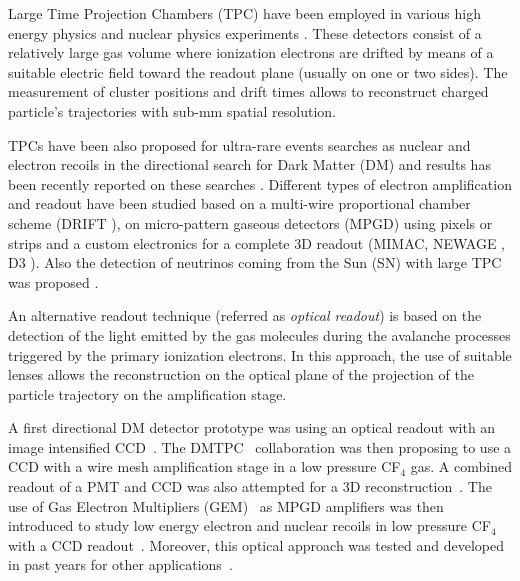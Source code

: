 \documentclass[review]{elsarticle}
\begin{document}
Large Time Projection Chambers (TPC)  have been  employed  in various high energy physics and nuclear physics experiments \cite{bib:tpc1,bib:tpc2,bib:tpc3,bib:tpc4}. These detectors consist of a relatively large gas volume where ionization electrons are drifted by means of a suitable electric field toward the readout plane (usually on one or two sides). The measurement of cluster positions and drift times allows to reconstruct charged particle's trajectories with sub-mm spatial resolution. %

 TPCs have been also proposed for ultra-rare events searches as nuclear and electron recoils in  the directional search for   Dark Matter (DM) and  results has been recently reported on these searches  \cite{Battat:2016xxe,  BATTAT20151,Ikeda:2020mvr}. Different types of electron amplification and readout have been studied\cite{Battat:2016pap} based on a  multi-wire proportional chamber scheme (DRIFT \cite{BATTAT20151,ALNER2005173}), on micro-pattern gaseous detectors (MPGD) using pixels or strips and a custom electronics for a complete 3D readout (MIMAC\cite{Riffard:2016mgw,Sauzet:2020dut}, NEWAGE \cite{Hashimoto:2017hlz}, D3 \cite{bib:vahsen}). Also the detection of neutrinos  coming from the Sun (SN) with large TPC  was proposed \cite{Seguinot:1992zu, ARPESELLA1996333}.
  
An alternative readout technique (referred as {\it optical readout}) is based on the detection of the light emitted by the gas molecules during the avalanche processes triggered by the primary ionization electrons\cite{bib:Fraga,bib:Margato1,bib:Margato2}. In this approach, the use of suitable lenses allows the reconstruction on the optical plane of the projection of the particle trajectory on the amplification stage.

A first directional DM detector prototype was using an optical readout with an image intensified CCD~\cite{Buckland}.  The DMTPC~\cite{Deaconu:2017vam} collaboration was then proposing to use a CCD with a wire mesh amplification stage in a low pressure CF$_4$ gas. A combined readout of a PMT and CCD  was also attempted for a 3D reconstruction~\cite{BATTAT20146, bib:pmt1}. 
 The use of   Gas Electron Multipliers (GEM)~\cite{Sauli:1997qp} as MPGD  amplifiers  was then introduced to study  low energy electron and nuclear recoils in low pressure CF$_4$ with a CCD readout~\cite{bib:loomba55Fe}.
Moreover, this optical approach was tested and developed in past years  for other applications~\cite{bib:opto1,bib:opto2,BRUNBAUER201824}.
\end{document}
